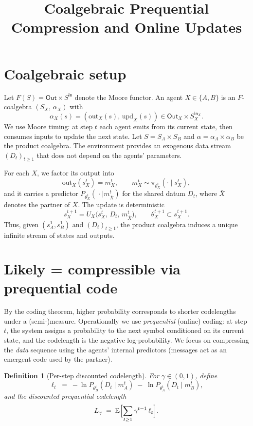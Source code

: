 \documentclass{article}
\title{Coalgebraic Prequential Compression and Online Updates}
\author{}
\date{}
\newtheorem{definition}{Definition}
\begin{document}
\maketitle

\section{Coalgebraic setup}
Let $F(S) = \mathsf{Out} \times S^{\mathsf{In}}$ denote the Moore functor. An agent $X\in\{A,B\}$ is an $F$-coalgebra $(S_X,\, \alpha_X)$ with
\[
  \alpha_X(s) = (\mathrm{out}_X(s),\, \mathrm{upd}_X(s)) \in \mathsf{Out}_X \times S_X^{\mathsf{In}_X}.
\]
We use Moore timing: at step $t$ each agent emits from its current state, then consumes inputs to update the next state. Let $S = S_A \times S_B$ and $\alpha = \alpha_A \times \alpha_B$ be the product coalgebra. The environment provides an exogenous data stream $(D_t)_{t\ge 1}$ that does not depend on the agents' parameters.

For each $X$, we factor its output into
\[
  \mathrm{out}_X(s_X^t) = m_{X}^t, \qquad m_X^t \sim \pi_{\theta_X^t}(\cdot\mid s_X^t),
\]
and it carries a predictor $P_{\theta_X^t}(\,\cdot\mid m_{\bar X}^t)$ for the shared datum $D_t$, where $\bar X$ denotes the partner of $X$. The update is deterministic
\[
  s_X^{t+1} = U_X\bigl(s_X^t,\, D_t,\, m_{\bar X}^t\bigr),\qquad \theta_X^{t+1} \subset s_X^{t+1}.
\]
Thus, given $(s_A^1,s_B^1)$ and $(D_t)_{t\ge 1}$, the product coalgebra induces a unique infinite stream of states and outputs.

\section{Likely = compressible via prequential code}
By the coding theorem, higher probability corresponds to shorter codelengths under a (semi-)measure. Operationally we use \emph{prequential} (online) coding: at step $t$, the system assigns a probability to the next symbol conditioned on its current state, and the codelength is the negative log-probability. We focus on compressing the \emph{data} sequence using the agents' internal predictors (messages act as an emergent code used by the partner).

\begin{definition}[Per-step discounted codelength]
For $\gamma\in(0,1)$, define
\[
  \ell_t \;=\; -\ln P_{\theta_B^t}(D_t\mid m_A^t)\; -\; \ln P_{\theta_A^t}(D_t\mid m_B^t),
\]
and the discounted prequential codelength
\[
  L_\gamma\;=\; \mathbb{E}\Bigl[\sum_{t\ge 1} \gamma^{t-1}\, \ell_t\Bigr].
\]
\end{definition}
\end{document}
